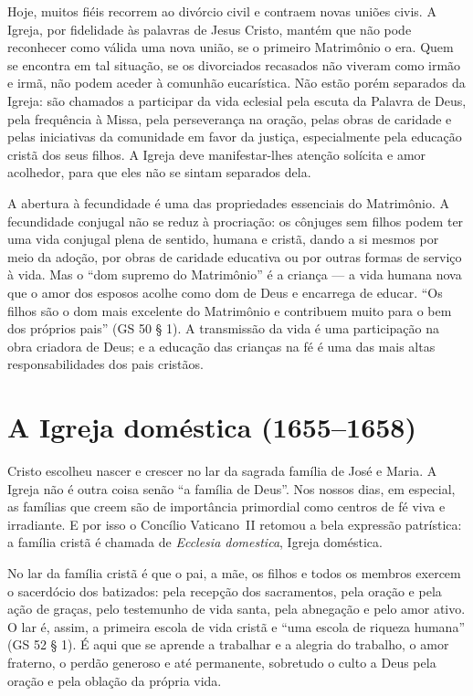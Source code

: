 Hoje, muitos fiéis recorrem ao divórcio civil e contraem novas uniões civis. A Igreja, por fidelidade às palavras de Jesus Cristo, mantém que não pode reconhecer como válida uma nova união, se o primeiro Matrimônio o era. Quem se encontra em tal situação, se os divorciados recasados não viveram como irmão e irmã, não podem aceder à comunhão eucarística. Não estão porém separados da Igreja: são chamados a participar da vida eclesial pela escuta da Palavra de Deus, pela frequência à Missa, pela perseverança na oração, pelas obras de caridade e pelas iniciativas da comunidade em favor da justiça, especialmente pela educação cristã dos seus filhos. A Igreja deve manifestar-lhes atenção solícita e amor acolhedor, para que eles não se sintam separados dela.

A abertura à fecundidade é uma das propriedades essenciais do Matrimônio. A fecundidade conjugal não se reduz à procriação: os cônjuges sem filhos podem ter uma vida conjugal plena de sentido, humana e cristã, dando a si mesmos por meio da adoção, por obras de caridade educativa ou por outras formas de serviço à vida. Mas o ``dom supremo do Matrimônio'' é a criança --- a vida humana nova que o amor dos esposos acolhe como dom de Deus e encarrega de educar. ``Os filhos são o dom mais excelente do Matrimônio e contribuem muito para o bem dos próprios pais'' (GS 50 § 1). A transmissão da vida é uma participação na obra criadora de Deus; e a educação das crianças na fé é uma das mais altas responsabilidades dos pais cristãos.

\section{A Igreja doméstica (1655--1658)}

Cristo escolheu nascer e crescer no lar da sagrada família de José e Maria. A Igreja não é outra coisa senão ``a família de Deus''. Nos nossos dias, em especial, as famílias que creem são de importância primordial como centros de fé viva e irradiante. E por isso o Concílio Vaticano~II retomou a bela expressão patrística: a família cristã é chamada de \textit{Ecclesia domestica}, Igreja doméstica.

No lar da família cristã é que o pai, a mãe, os filhos e todos os membros exercem o sacerdócio dos batizados: pela recepção dos sacramentos, pela oração e pela ação de graças, pelo testemunho de vida santa, pela abnegação e pelo amor ativo. O lar é, assim, a primeira escola de vida cristã e ``uma escola de riqueza humana'' (GS 52 § 1). É aqui que se aprende a trabalhar e a alegria do trabalho, o amor fraterno, o perdão generoso e até permanente, sobretudo o culto a Deus pela oração e pela oblação da própria vida.

